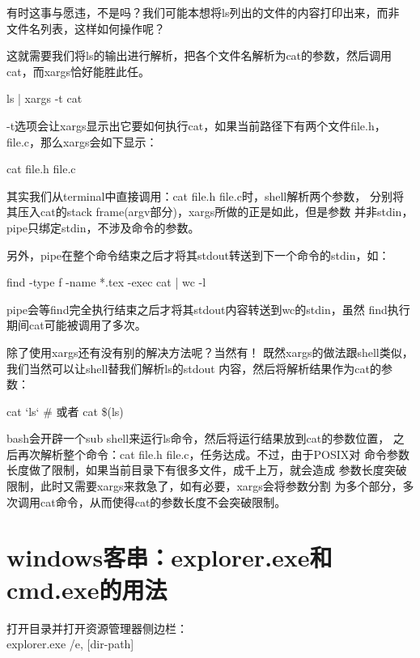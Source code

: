 ﻿\documentclass[a4paper,11pt]{article}
\begin{document}
  有时这事与愿违，不是吗？我们可能本想将ls列出的文件的内容打印出来，而非
  文件名列表，这样如何操作呢？

  这就需要我们将ls的输出进行解析，把各个文件名解析为cat的参数，然后调用
  cat，而xargs恰好能胜此任。

  \begin{bashcode}
    ls | xargs -t cat
  \end{bashcode}

  -t选项会让xargs显示出它要如何执行cat，如果当前路径下有两个文件file.h，
  file.c，那么xargs会如下显示：

  \begin{bashcode}
    cat file.h file.c
  \end{bashcode}

  其实我们从terminal中直接调用：cat file.h file.c时，shell解析两个参数，
  分别将其压入cat的stack frame(argv部分)，xargs所做的正是如此，但是参数
  并非stdin，pipe只绑定stdin，不涉及命令的参数。

  另外，pipe在整个命令结束之后才将其stdout转送到下一个命令的stdin，如：
  
  \begin{bashcode}
    find -type f -name *.tex -exec cat {} \; | wc -l
  \end{bashcode}

  pipe会等find完全执行结束之后才将其stdout内容转送到wc的stdin，虽然
  find执行期间cat可能被调用了多次。


  除了使用xargs还有没有别的解决方法呢？当然有！
  既然xargs的做法跟shell类似，我们当然可以让shell替我们解析ls的stdout
  内容，然后将解析结果作为cat的参数：

  \begin{bashcode}
    cat `ls`
    # 或者
    cat \$(ls)
  \end{bashcode}

  bash会开辟一个sub shell来运行ls命令，然后将运行结果放到cat的参数位置，
  之后再次解析整个命令：cat file.h file.c，任务达成。不过，由于POSIX对
  命令参数长度做了限制，如果当前目录下有很多文件，成千上万，就会造成
  参数长度突破限制，此时又需要xargs来救急了，如有必要，xargs会将参数分割
  为多个部分，多次调用cat命令，从而使得cat的参数长度不会突破限制。

  \section[Windows客串：explorer.exe和cmd.exe的用法]{windows客串：explorer.exe和cmd.exe的用法}
  打开目录并打开资源管理器侧边栏：\\
  explorer.exe /e, [dir-path]
\end{document}
